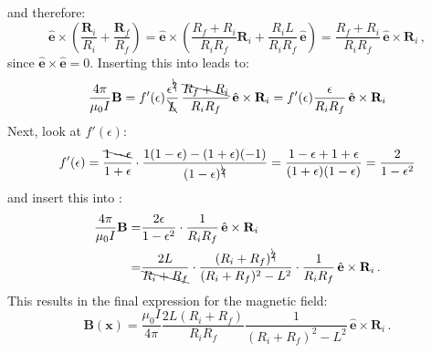 and therefore:
\begin{equation}
   \hat{\mathbf{e}} \times \left( \frac{\mathbf{R}_i}{R_i} + \frac{\mathbf{R}_f}{R_f} \right)
 = \hat{\mathbf{e}} \times \left( \frac{R_f+R_i}{R_i R_f} \mathbf{R}_i + \frac{R_i L}{R_i R_f} \, \hat{\mathbf{e}} \right)
 = \frac{R_f+R_i}{R_i R_f} \, \hat{\mathbf{e}} \times \mathbf{R}_i \, ,
\end{equation}
since $\hat{\mathbf{e}} \times \hat{\mathbf{e}} = 0$.
Inserting this into  leads to:
\begin{equation}
   \frac{4 \pi}{\mu_0 I} \mathbf{B}
 = f'(\epsilon) \frac{\epsilon^{\bcancel{2}}}{\bcancel{L}} \, \frac{\bcancel{R_f+R_i}}{R_i R_f} \, \hat{\mathbf{e}} \times \mathbf{R}_i
 = f'(\epsilon) \frac{\epsilon}{R_i R_f} \, \hat{\mathbf{e}} \times \mathbf{R}_i \label{eqn:B_intermediate_2}
\end{equation}
Next, look at $f'(\epsilon)$:
\begin{equation}
   f'(\epsilon)
 = \frac{\bcancel{1 - \epsilon}}{1 + \epsilon} \cdot \frac{1 (1-\epsilon) - (1+\epsilon) (-1)}{(1 - \epsilon)^{\bcancel{2}}}
 = \frac{1 - \epsilon + 1 + \epsilon}{(1 + \epsilon)(1 - \epsilon)}
 = \frac{2}{1 - \epsilon^2}
\end{equation}
and insert this into :
\begin{align}
   \frac{4 \pi}{\mu_0 I} \mathbf{B}
 = & \frac{2 \epsilon}{1 - \epsilon^2} \cdot \frac{1}{R_i R_f} \, \hat{\mathbf{e}} \times \mathbf{R}_i \\
 = & \frac{2 L}{\bcancel{R_i + R_f}} \cdot \frac{(R_i + R_f)^{\bcancel{2}}}{(R_i + R_f)^2 - L^2} \cdot \frac{1}{R_i R_f} \, \hat{\mathbf{e}} \times \mathbf{R}_i \, .
\end{align}
This results in the final expression for the magnetic field:
\begin{equation}
 \boxed{\mathbf{B} (\mathbf{x}) = \frac{\mu_0 I}{4 \pi} \frac{2 L (R_i + R_f)}{R_i R_f} \frac{1}{(R_i + R_f)^2 - L^2} \, \hat{\mathbf{e}} \times \mathbf{R}_i } \, .
\end{equation}


